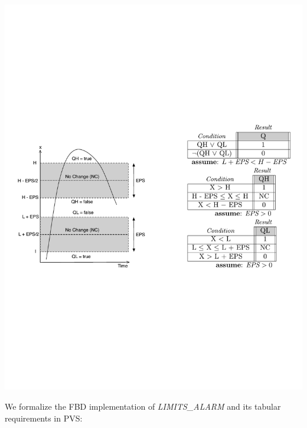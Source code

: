 \documentclass[a0,landscape]{a0poster}
\def\graphspacing{\vspace{.5cm}}
\newcommand{\capcolor}[1]{{\color{Black} #1}}
\newcommand{\var}[1]{{\small \textit{#1}}}
\begin{document}
\begin{multicols}{4}
\begin{center}\graphspacing
\includegraphics[width=\linewidth]{figures/limits_alarm/limits_alarm_tab_req}
\end{center}\graphspacing

\noindent We formalize the FBD implementation of \var{LIMITS\_ALARM} and its tabular requirements in PVS:


\end{multicols}
\end{document}
